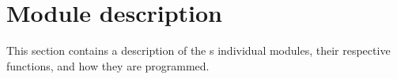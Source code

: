 \section{Module description} \label{sec:module-description}

This section contains a description of the \projname{}s individual modules, their respective functions, and how they are programmed.



%


